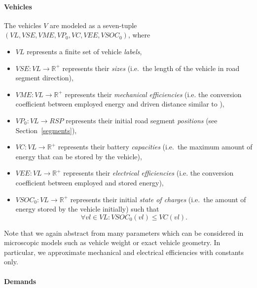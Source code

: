 \paragraph{Vehicles}
\label{vehicles}

The vehicles $V$ are modeled as a seven-tuple $(VL, VSE, VME, VP_0, VC, VEE, VSOC_0)$, where
\begin{itemize}
	\item $VL$ represents a finite set of vehicle \textit{labels},
	\item $VSE: VL \rightarrow \mathbb{R}^+$ represents their \textit{sizes} (i.e.\ the length of the vehicle in road segment direction),
	\item $VME: VL \rightarrow \mathbb{R}^+$ represents their \textit{mechanical efficiencies} (i.e. the conversion coefficient between employed energy and driven distance similar to \cite{gao2007modeling}),
	\item $VP_0: VL \rightarrow RSP$ represents their initial road segment \textit{positions} (see Section~\ref{segments}),
	\item $VC: VL \rightarrow \mathbb{R}^+$ represents their battery \textit{capacities} (i.e.\ the maximum amount of energy that can be stored by the vehicle),
	\item $VEE: VL \rightarrow \mathbb{R}^+$ represents their \textit{electrical efficiencies} (i.e. the conversion coefficient between employed and stored energy),
	\item $VSOC_0: VL \rightarrow \mathbb{R}^+$ represents their initial \textit{state of charges} (i.e.\ the amount of energy stored by the vehicle initially) such that
	\[
		\forall vl \in VL : VSOC_0(vl) \leq VC(vl) \textrm{.}
	\]
\end{itemize}
Note that we again abstract from many parameters which can be considered in microscopic models \cite{gao2007modeling} such as vehicle weight or exact vehicle geometry. In particular, we approximate mechanical and electrical efficiencies with constants only.

\paragraph{Demands}
\label{demands}

